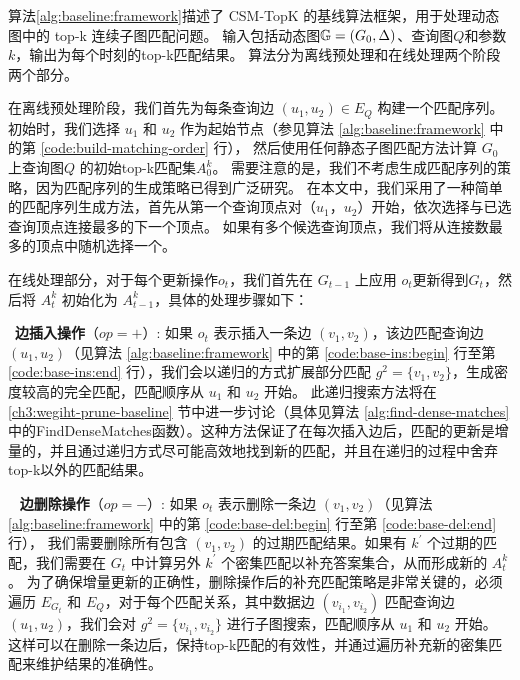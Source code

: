 算法\ref{alg:baseline:framework}描述了 CSM-TopK 的基线算法框架，用于处理动态图中的 top-k 连续子图匹配问题。
输入包括动态图$\mathbb{G}=(G_0, \Delta)$、查询图$Q$和参数$k$，输出为每个时刻的top-k匹配结果。
算法分为离线预处理和在线处理两个阶段两个部分。

在离线预处理阶段，我们首先为每条查询边 $(u_1, u_2) \in E_Q$ 构建一个匹配序列。初始时，我们选择 $u_1$ 和 $u_2$ 作为起始节点（参见算法 \ref{alg:baseline:framework} 中的第 \ref{code:build-matching-order} 行），
然后使用任何静态子图匹配方法计算 $G_0$ 上查询图$Q$ 的初始top-k匹配集$A_0^k$。
需要注意的是，我们不考虑生成匹配序列的策略，因为匹配序列的生成策略已得到广泛研究。
在本文中，我们采用了一种简单的匹配序列生成方法，首先从第一个查询顶点对（$u_1$，$u_2$）开始，依次选择与已选查询顶点连接最多的下一个顶点。
如果有多个候选查询顶点，我们将从连接数最多的顶点中随机选择一个。

在线处理部分，对于每个更新操作$o_t$，我们首先在 $G_{t-1}$ 上应用 $o_t$更新得到$G_t$，然后将 $A_t^k$ 初始化为 $A_{t-1}^k$，具体的处理步骤如下：

\textbullet~\textbf{边插入操作}（$op=+$）: 如果 $o_t$ 表示插入一条边 $(v_1, v_2)$，该边匹配查询边 $(u_1, u_2)$（见算法 \ref{alg:baseline:framework} 中的第 \ref{code:base-ins:begin} 行至第 \ref{code:base-ins:end} 行），我们会以递归的方式扩展部分匹配 $g^2 = \{v_1, v_2\}$，生成密度较高的完全匹配，匹配顺序从 $u_1$ 和 $u_2$ 开始。 此递归搜索方法将在 \ref{ch3:wegiht-prune-baseline} 节中进一步讨论（具体见算法 \ref{alg:find-dense-matches} 中的FindDenseMatches函数）。这种方法保证了在每次插入边后，匹配的更新是增量的，并且通过递归方式尽可能高效地找到新的匹配，并且在递归的过程中舍弃top-k以外的匹配结果。

\textbullet~ \textbf{边删除操作}（$op=-$）:  如果 $o_t$ 表示删除一条边 $(v_1, v_2)$（见算法 \ref{alg:baseline:framework} 中的第 \ref{code:base-del:begin} 行至第 \ref{code:base-del:end} 行），
我们需要删除所有包含 $(v_1, v_2)$ 的过期匹配结果。如果有 $k^\prime$ 个过期的匹配，我们需要在 $G_t$ 中计算另外 $k^\prime$ 个密集匹配以补充答案集合，从而形成新的 $A_{t}^k$。
为了确保增量更新的正确性，删除操作后的补充匹配策略是非常关键的，必须遍历 $E_{G_t}$ 和 $E_Q$，对于每个匹配关系，其中数据边 $(v_{i_1}, v_{i_2})$ 匹配查询边 $(u_1, u_2)$，我们会对 $g^2 = \{v_{i_1}, v_{i_2}\}$ 进行子图搜索，匹配顺序从 $u_1$ 和 $u_2$ 开始。
这样可以在删除一条边后，保持top-k匹配的有效性，并通过遍历补充新的密集匹配来维护结果的准确性。

